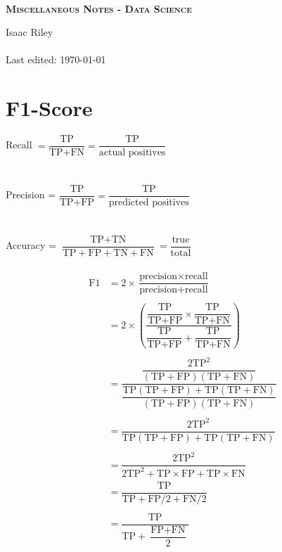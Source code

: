 \documentclass[a4, 12pt]{article}
\newcommand{\tp}{\textrm{TP}}
\newcommand{\tn}{\textrm{TN}}
\newcommand{\fp}{\textrm{FP}}
\newcommand{\fn}{\textrm{FN}}
\begin{document}
\begin{titlepage}


\thispagestyle{fancy}

\vphantom{x}

\vspace{0.5in}

\center


\textsc{\large  }

\vspace{0.5in}

\noindent\makebox[\linewidth]{\rule{\linewidth}{1.2pt}}\\
\vspace{2mm}
\textsc{ \textbf{\large Miscellaneous Notes - Data Science }}
\noindent\makebox[\linewidth]{\rule{\linewidth}{1.2pt}}

\vspace{2.5in}
Isaac Riley\\~\\

Last edited: \today

\end{titlepage}

\newpage

\setcounter{page}{2}
\tableofcontents
\newpage
\section{F1-Score}
Recall $= \dfrac{\tp}{\tp+\fn} = \dfrac{\tp}{\textrm{actual positives}}$\\~\\~\\
Precision = $\dfrac{\tp}{\tp+\fp} = \dfrac{\tp}{\textrm{predicted positives}}$\\~\\~\\
Accuracy = $\dfrac{\tp+\tn}{\tp+\fp+\tn+\fn} = \dfrac{\textrm{true}}{\textrm{total}}$\\~\\
\begin{align*}
\textrm{F1} &= 2\times \dfrac{\textrm{precision}\times \textrm{recall}}{\textrm{precision}+ \textrm{recall}}\\~\\
&= 2 \times \left( \dfrac{\dfrac{\tp}{\tp+\fp} \times \dfrac{\tp}{\tp+\fn}}{\dfrac{\tp}{\tp+\fp}+\dfrac{\tp}{\tp+\fn}} \right) \\~\\
&= \dfrac{\dfrac{2\tp^2}{(\tp+\fp)(\tp+\fn)}}{\dfrac{\tp(\tp+\fp)+\tp(\tp+\fn)}{(\tp+\fp)(\tp+\fn)}} \\~\\
&= \dfrac{2\tp^2}{\tp(\tp+\fp)+\tp(\tp+\fn)} \\~\\
&= \dfrac{2\tp^2}{2\tp^2+\tp \times \fp + \tp \times \fn} \\
&= \dfrac{\tp}{\tp+\fp/2 + \fn/2} \\~\\
&= \dfrac{\tp}{\tp+\dfrac{\fp+\fn}{2}}
\end{align*}
\end{document}
